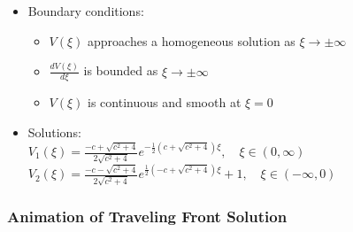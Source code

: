\documentclass{beamer}
\begin{document}
\begin{frame}
\begin{itemize}
	\item Boundary conditions:
		\begin{itemize}
			\item $V(\xi)$ approaches a homogeneous solution as $\xi \rightarrow\pm\infty$
			\item $\frac{d V(\xi)}{d\xi}$ is bounded as $\xi\rightarrow\pm\infty$
			\item $V(\xi)$ is continuous and smooth at $\xi=0$
		\end{itemize}
\end{itemize}

\begin{itemize}
	\item Solutions: \\$V_1(\xi)=\frac{-c+\sqrt{c^2+4}}{2\sqrt{c^2+4}}e^{-\frac{1}{2}(c+\sqrt{c^2+4})\xi},\quad \xi \in (0,\infty)$\\$V_2(\xi)=\frac{-c-\sqrt{c^2+4}}{2\sqrt{c^2+4}}e^{\frac{1}{2}(-c+\sqrt{c^2+4})\xi}+1,\quad \xi \in (-\infty,0)$
\end{itemize}
	\centering
\frametitle{Animation of Traveling Front Solution}


\end{frame}
\end{document}

